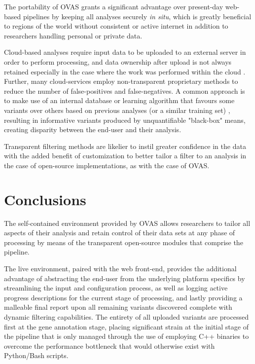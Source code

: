 \documentclass[twocolumn]{bmcart}%
\def\app{OVAS}
\begin{document}
The portability of \app{} grants a significant advantage over present-day web-based pipelines by keeping all analyses securely \textit{in situ}, which is greatly beneficial to regions of the world without consistent or active internet in addition to researchers handling personal or private data.

Cloud-based analyses require input data to be uploaded to an external server in order to perform processing, and data ownership after upload is not always retained especially in the case where the work was performed within the cloud \cite{reed2010information}. Further, many cloud-services employ non-transparent proprietary methods to reduce the number of false-positives and false-negatives. A common approach is to make use of an internal database or learning algorithm that favours some variants over others based on previous analyses (or a similar training set) \cite{pabinger2014survey}, resulting in informative variants produced by unquantifiable "black-box" means, creating disparity between the end-user and their analysis.

Transparent filtering methods are likelier to instil greater confidence in the data with the added benefit of customization to better tailor a filter to an analysis in the case of open-source implementations, as with the case of \app{}.



\section*{Conclusions}

The self-contained environment provided by \app{} allows researchers to tailor all aspects of their analysis and retain control of their data sets at any phase of processing by means of the transparent open-source modules that comprise the pipeline. 

The live environment, paired with the web front-end, provides the additional advantage of abstracting the end-user from the underlying platform specifics by streamlining the input and configuration process, as well as logging active progress descriptions for the current stage of processing, and lastly providing a malleable final report upon all remaining variants discovered complete with dynamic filtering capabilities. The entirety of all uploaded variants are processed first at the gene annotation stage, placing significant strain at the initial stage of the pipeline that is only managed through the use of employing C++ binaries to overcome the performance bottleneck that would otherwise exist with Python/Bash scripts.
\end{document}
